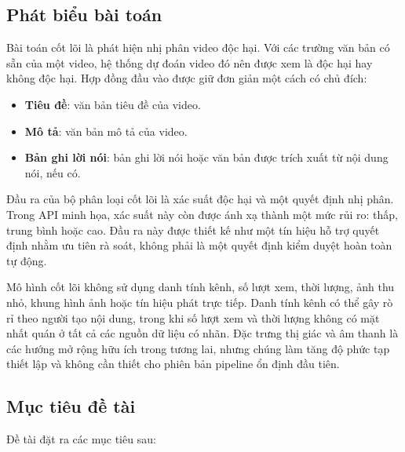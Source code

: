 \subsection{Phát biểu bài toán}

Bài toán cốt lõi là phát hiện nhị phân video độc hại. Với các trường văn bản có sẵn của một video, hệ thống dự đoán video đó nên được xem là độc hại hay không độc hại. Hợp đồng đầu vào được giữ đơn giản một cách có chủ đích:

\begin{itemize}
    \item \textbf{Tiêu đề}: văn bản tiêu đề của video.
    \item \textbf{Mô tả}: văn bản mô tả của video.
    \item \textbf{Bản ghi lời nói}: bản ghi lời nói hoặc văn bản được trích xuất từ nội dung nói, nếu có.
\end{itemize}

Đầu ra của bộ phân loại cốt lõi là xác suất độc hại và một quyết định nhị phân. Trong API minh họa, xác suất này còn được ánh xạ thành một mức rủi ro: thấp, trung bình hoặc cao. Đầu ra này được thiết kế như một tín hiệu hỗ trợ quyết định nhằm ưu tiên rà soát, không phải là một quyết định kiểm duyệt hoàn toàn tự động.

Mô hình cốt lõi không sử dụng danh tính kênh, số lượt xem, thời lượng, ảnh thu nhỏ, khung hình ảnh hoặc tín hiệu phát trực tiếp. Danh tính kênh có thể gây rò rỉ theo người tạo nội dung, trong khi số lượt xem và thời lượng không có mặt nhất quán ở tất cả các nguồn dữ liệu có nhãn. Đặc trưng thị giác và âm thanh là các hướng mở rộng hữu ích trong tương lai, nhưng chúng làm tăng độ phức tạp thiết lập và không cần thiết cho phiên bản pipeline ổn định đầu tiên.

\subsection{Mục tiêu đề tài}

Đề tài đặt ra các mục tiêu sau:


